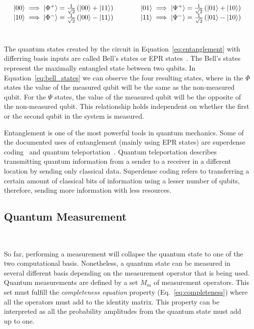 \begin{equation}\label{eq:bell_states}
  \begin{matrix}
    \ket{00} \implies \ket{\Phi^+} = \frac{1}{\sqrt{2}} \left(\ket{00} + \ket{11}\right) \\
    \ket{10} \implies \ket{\Phi^-} = \frac{1}{\sqrt{2}} \left(\ket{00} - \ket{11}\right) 
  \end{matrix} \qquad \qquad
  \begin{matrix}
    \ket{01} \implies \ket{\Psi^+} = \frac{1}{\sqrt{2}} \left(\ket{01} + \ket{10}\right) \\
    \ket{11} \implies \ket{\Psi^-} = \frac{1}{\sqrt{2}} \left(\ket{01} - \ket{10}\right)
  \end{matrix}
\end{equation} \

The quantum states created by the circuit in Equation~\ref{eq:entanglement}
with differring basis inputs are called Bell's states or EPR
states~\cite{einstein_can_1935}. The Bell's states represent the maximally entangled
state between two qubits. In Equation~\ref{eq:bell_states} we can observe
the four resulting states, where in the \(\Phi\) states the value of the
measured qubit will be the same as the non-measured qubit. For the \(\Psi\)
states, the value of the measured qubit will be the opposite of the
non-measured qubit. This relationship holds independent on whether the
first or the second qubit in the system is measured. \

Entanglement is one of the most powerful tools in quantum mechanics.
Some of the documented uses of entanglement (mainly using EPR states)
are superdense coding~\cite{bennett_communication_1992} and quantum
teleportation~\cite{bennett_teleporting_1993}. Quantum teleportation
describes transmitting quantum information from a sender to a receiver
in a different location by sending only classical data. Superdense
coding refers to transferring a certain amount of classical bits of
information using a lesser number of qubits, therefore, sending more
information with less resources. \

\subsection{Quantum Measurement}\label{subsection:measurement} \

So far, performing a measurement will collapse the quantum state to
one of the two computational basis. Nonetheless, a quantum state
can be measured in several different basis depending on the
measurement operator that is being used. Quantum measurements
are defined by a set \(M_m\) of measurement operators. This
set must fulfill the \textit{completeness equation} property
(Eq.~\ref{eq:completeness}) where all the operators must add
to the identity matrix. This property can be interpreted as
all the probability amplitudes from the quantum state must
add up to one. \

